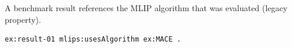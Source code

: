 A benchmark result references the MLIP algorithm that was evaluated (legacy property).
\begin{lstlisting}[language=turtle]
ex:result-01 mlips:usesAlgorithm ex:MACE .
\end{lstlisting}
